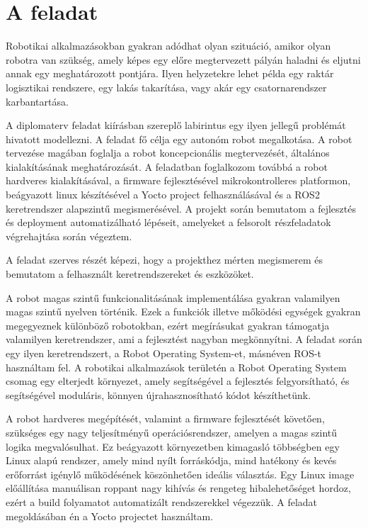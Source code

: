 \section{A feladat}

Robotikai alkalmazásokban gyakran adódhat olyan szituáció, amikor olyan robotra
van szükség, amely képes egy előre megtervezett pályán haladni és eljutni annak
egy meghatározott pontjára. Ilyen helyzetekre lehet példa egy raktár logisztikai
rendszere, egy lakás takarítása, vagy akár egy csatornarendszer karbantartása.

\medskip

A diplomaterv feladat kiírásban szereplő labirintus egy ilyen jellegű problémát
hivatott modellezni. A feladat fő célja egy autonóm robot megalkotása. A robot
tervezése magában foglalja a robot koncepcionális megtervezését, általános
kialakításának meghatározását. A feladatban foglalkozom továbbá a robot hardveres
kialakításával, a firmware fejlesztésével mikrokontrolleres platformon,
beágyazott linux készítésével a Yocto project felhasználásával és a ROS2
keretrendszer alapszintű megismerésével. A projekt során bemutatom a fejlesztés
és deployment automatizálható lépéseit, amelyeket a felsorolt részfeladatok
végrehajtása során végeztem.

A feladat szerves részét képezi, hogy a projekthez mérten megismerem és bemutatom
a felhasznált keretrendszereket és eszközöket.

A robot magas szintű funkcionalitásának implementálása gyakran valamilyen magas
szintű nyelven történik. Ezek a funkciók illetve mőködési egységek gyakran
megegyeznek különböző robotokban, ezért megírásukat gyakran támogatja valamilyen
keretrendszer, ami a fejlesztést nagyban megkönnyítni. A feladat során egy ilyen
keretrendszert, a Robot Operating System-et, másnéven ROS-t használtam fel. A
robotikai alkalmazások területén a Robot Operating System csomag egy elterjedt
környezet, amely segítségével a fejlesztés felgyorsítható, és segítségével
moduláris, könnyen újrahasznosítható kódot készíthetünk.

A robot hardveres megépítését, valamint a firmware fejlesztését követően,
szükséges egy nagy teljesítményű operációsrendszer, amelyen a magas szintű logika
megvalósulhat. Ez beágyazott környezetben kimagasló többségben egy Linux alapú
rendszer, amely mind nyílt forráskódja, mind hatékony és kevés erőforrást igénylő
működésének köszönhetően ideális választás. Egy Linux image előállítása
manuálisan roppant nagy kihívás és rengeteg hibalehetőséget hordoz, ezért a build
folyamatot automatizált rendszerekkel végezzük. A feladat megoldásában én a Yocto
projectet használtam.

